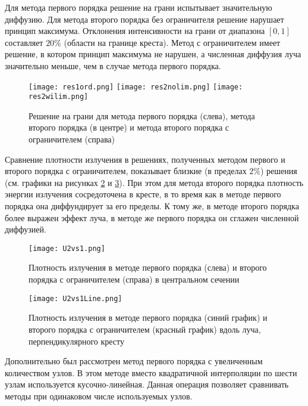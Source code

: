 
Для метода первого порядка решение на грани испытывает значительную диффузию. Для метода второго порядка без ограничителя решение нарушает принцип максимума. Отклонения интенсивности на грани от диапазона $[0, 1]$ составляет $20 \%$ (области на границе креста). Метод с ограничителем имеет решение, в котором принцип максимума не нарушен, а численная диффузия луча значительно меньше, чем в случае метода первого порядка.

\begin{figure}[ht!]
\centering
\texttt{[image: res1ord.png]}
\texttt{[image: res2nolim.png]}
\texttt{[image: res2wilim.png]}
\caption{Решение на грани для метода первого порядка (слева), метода второго порядка (в центре) и метода второго порядка с ограничителем (справа)}
\label{fig:limiter}
\end{figure}

Сравнение плотности излучения в решениях, полученных методом первого и второго порядка с ограничителем, показывает близкие (в пределах $2\%$) решения (см. графики на рисунках \ref{fig:U2vs1} и \ref{fig:U2vs1Line}). При этом для метода второго порядка плотность энергии излучения сосредоточена в кресте, в то время как в методе первого порядка она диффундирует за его пределы. К тому же, в методе второго порядка более выражен эффект луча, в методе же первого порядка он сглажен численной диффузией.

\begin{figure}[ht!]
\centering
\texttt{[image: U2vs1.png]}
\caption{Плотность излучения в методе первого порядка (слева) и второго порядка с ограничителем (справа) в центральном сечении}
\label{fig:U2vs1}
\end{figure}

\begin{figure}[ht!]
\centering
\texttt{[image: U2vs1Line.png]}
\caption{Плотность излучения в методе первого порядка (синий график) и второго порядка с ограничителем (красный график) вдоль луча, перпендикулярного кресту}
\label{fig:U2vs1Line}
\end{figure}

Дополнительно был рассмотрен метод первого порядка с увеличенным количеством узлов. В этом методе вместо квадратичной интерполяции по шести узлам используется кусочно-линейная. Данная операция позволяет сравнивать методы при одинаковом числе используемых узлов. 

